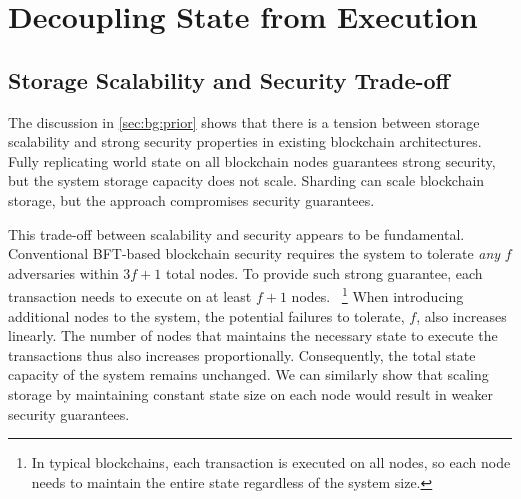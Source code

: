 \section{Decoupling State from Execution}
\label{sec:approach}

\subsection{Storage Scalability and Security Trade-off}
\label{sec:approach:tradeoff}

\fi

The discussion in \cref{sec:bg:prior} shows that there is a tension between storage scalability and strong security properties in existing blockchain architectures.
Fully replicating world state on all blockchain nodes guarantees strong security, but the system storage capacity does not scale.
Sharding can scale blockchain storage, but the approach compromises security guarantees.

This trade-off between scalability and security appears to be fundamental.
Conventional BFT-based blockchain security requires the system to tolerate \emph{any} $f$ adversaries within $3f + 1$ total nodes.
To provide such strong guarantee, each transaction needs to execute on at least $f+1$ nodes.
~\footnote{In typical blockchains, each transaction is executed on all nodes, so each node needs to maintain the entire state regardless of the system size.}
When introducing additional nodes to the system, the potential failures to tolerate, $f$, also increases linearly.
The number of nodes that maintains the necessary state to execute the transactions thus also increases proportionally.
Consequently, the total state capacity of the system remains unchanged.
We can similarly show that scaling storage by maintaining constant state size on each node would result in weaker security guarantees.


